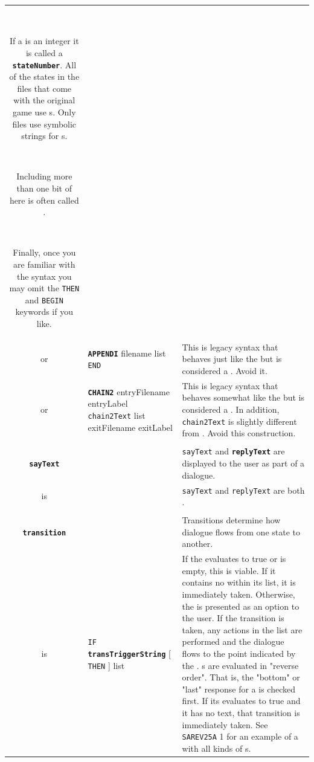 \documentclass{article}
\def\ttref#1{\ahrefloc{#1}{\tt #1}}
\def\DEFINE#1{{\tt \bf #1}\label{#1}\index{#1}}
\def\t#1{{\tt #1}}
\def\Slist{{\color{red} list }}
\def\Ob{{\color{red} [ }}
\def\Oe{{\color{red} ] }}
\begin{document}
\begin{tabular}{cp{10in}|p{10in}}
  \

  If a \ttref{stateLabel} is an integer it is called a
  \DEFINE{stateNumber}. All of the states in the \ttref{DLG} files that
  come with the original game use \ttref{stateNumber}s. Only \ttref{D}
  files use symbolic strings for \ttref{stateLabel}s.

  \

  Including more than one bit of \ttref{sayText} here is often called
  \ttref{Multisay}.

  \

  Finally, once you are familiar with the syntax you may omit the \t{THEN}
  and \t{BEGIN} keywords if you like.
  \\

or & \DEFINE{APPENDI} filename \ttref{state} \Slist \t{END} &
  This is legacy syntax that behaves just like the \ttref{D Action}
  \ttref{APPEND} but is considered a \ttref{state}. Avoid it. \\

or & \DEFINE{CHAIN2} entryFilename entryLabel
  \t{chain2Text} \Slist exitFilename exitLabel &
  This is legacy syntax that behaves somewhat like the \ttref{D Action}
  \ttref{CHAIN} but is considered a \ttref{state}. In addition,
  \t{chain2Text} is slightly different from \ttref{chainText}. Avoid
  this construction. \\

\\

\DEFINE{sayText} & & \t{sayText} and \DEFINE{replyText} are displayed to
the user as part of a dialogue. \\
is & \ttref{text} & \t{sayText} and \t{replyText} are both \ttref{text}. \\

\\

\DEFINE{transition} & & Transitions determine how dialogue flows from one
state to another. \\

is & \t{IF} \DEFINE{transTriggerString} \Ob \t{THEN} \Oe
      \ttref{transFeature} \Slist \ttref{transNext} &
    If the \ttref{transTriggerString} evaluates to true or is empty, this
    \ttref{transition} is viable. If it contains no \ttref{replyText}
    within its \ttref{transFeature} list, it is immediately taken.
    Otherwise, the \ttref{replyText} is presented as an option to the user.
    If the transition is taken, any actions in the \ttref{transFeature}
    list are performed and the dialogue flows to the point indicated by the
    \ttref{transNext}.
  \ttref{transition}s are evaluated in "reverse order". That is, the "bottom"
  or "last" response for a \ttref{state} is checked first. If its
  \ttref{transTriggerString}
  evaluates to true and it has no \ttref{REPLY} text, that transition is
  immediately taken. See \t{SAREV25A} \ttref{state} 1 for an example of a
  \ttref{state} with all kinds of \ttref{transition}s. \\


\end{tabular}
\end{document}
